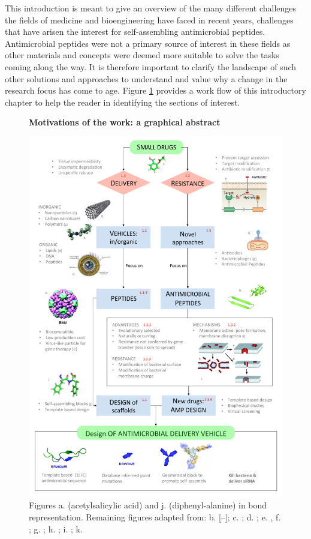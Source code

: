 \vspace{1cm}
This introduction is meant to give an overview of the many different challenges the fields of medicine and bioengineering have faced in recent years, challenges that have arisen the interest for self-assembling antimicrobial peptides. Antimicrobial peptides were not a primary source of interest in these fields as other materials and concepts were deemed more suitable to solve the tasks coming along the way. It is therefore important to clarify the landscape of such other solutions and approaches to understand and value why a change in the research focus has come to age. Figure \ref{fig:intro} provides a work flow of this introductory chapter to help the reader in identifying the sections of interest.

\begin{figure}
\begin{center}
\Large{\textbf{Motivations of the work: a graphical abstract}}\par\bigskip
\includegraphics[width = \textwidth]{pics/scheme_intro}
\caption[Graphical abstract of introduction]{Figures a. (acetylsalicylic acid) and j. (diphenyl-alanine) in bond representation. Remaining figures adapted from: b. [--]; c. \cite{poly}; d. \cite{lipo}; e. \cite{Schoonen2014}, f. \cite{Blair2014}; g. \cite{phage}; h. \cite{Torres2019}; i. \cite{Nguyen2011}; k. \cite{Castelletto2016}} \label{fig:intro}
\end{center}
\end{figure}

